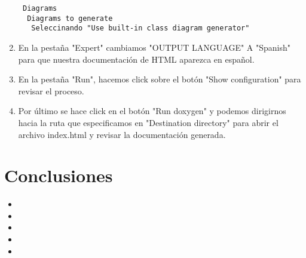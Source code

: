 \documentclass{article}
\begin{document}
\begin{enumerate}
\begin{lstlisting}
 Diagrams
  Diagrams to generate
   Seleccinando "Use built-in class diagram generator"
  \end{lstlisting}

  \item En la pestaña "Expert" cambiamos "OUTPUT LANGUAGE" A "Spanish" para que nuestra documentación de HTML aparezca en español.

  \item En la pestaña "Run", hacemos click sobre el botón "Show configuration" para revisar el proceso.

  \item Por último se hace click en el botón "Run doxygen" y podemos dirigirnos hacia la ruta que especificamos en "Destination directory" para abrir el archivo index.html y revisar la documentación generada.
  \end{enumerate}
  \newpage

  \section{Conclusiones}
  \begin{itemize}
  \item 
  \item 
  \item 
  \item 
  \item 
  \end{itemize}
\end{document}
